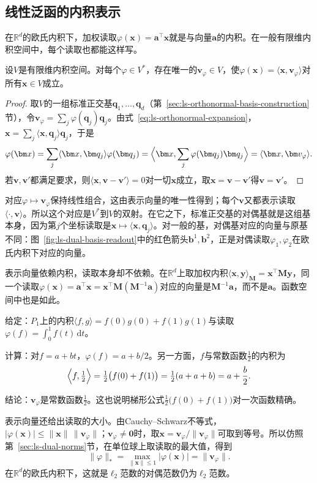 \subsection{线性泛函的内积表示}
\label{sec:ls-riesz-representation}
在$\mathbb R^d$的欧氏内积下，加权读取$\varphi(\bm x)=\bm a^\top\bm x$就是与向量$\bm a$的内积。在一般有限维内积空间中，每个读取也都能这样写。
\begin{theorem}[有限维Riesz表示定理]
\label{thm:ls-riesz-representation}
设$V$是有限维内积空间。对每个$\varphi\in V^*$，存在唯一的$\bm v_\varphi\in V$，使$\varphi(\bm x)=\langle\bm x,\bm v_\varphi\rangle$对所有$\bm x\in V$成立。
\end{theorem}
\begin{proof}
取$V$的一组标准正交基$\bm q_1,\ldots,\bm q_d$（第~\ref{sec:ls-orthonormal-basis-construction}节），令$\bm v_\varphi=\sum_j\varphi(\bm q_j)\bm q_j$。由式~\eqref{eq:ls-orthonormal-expansion}，$\bm x=\sum_j\langle\bm x,\bm q_j\rangle\bm q_j$，于是
\[
 \varphi(\bm x)=\sum_j\langle\bm x,\bm q_j\rangle\varphi(\bm q_j)=\Bigl\langle\bm x,\sum_j\varphi(\bm q_j)\bm q_j\Bigr\rangle=\langle\bm x,\bm v_\varphi\rangle.
\]
若$\bm v,\bm v'$都满足要求，则$\langle\bm x,\bm v-\bm v'\rangle=0$对一切$\bm x$成立，取$\bm x=\bm v-\bm v'$得$\bm v=\bm v'$。
\end{proof}
对应$\varphi\mapsto\bm v_\varphi$保持线性组合，这由表示向量的唯一性得到；每个$\bm v$又都表示读取$\langle\cdot,\bm v\rangle$。所以这个对应是$V^*$到$V$的双射。在它之下，标准正交基的对偶基就是这组基本身，因为第$j$个坐标读取是$\bm x\mapsto\langle\bm x,\bm q_j\rangle$。对一般的基，对偶基对应的向量与原基不同：图~\ref{fig:ls-dual-basis-readout}中的红色箭头$\bm b^1,\bm b^2$，正是对偶读取$\varphi_1,\varphi_2$在欧氏内积下对应的向量。

表示向量依赖内积，读取本身却不依赖。在$\mathbb R^d$上取加权内积$\langle\bm x,\bm y\rangle_{\bm M}=\bm x^\top\bm M\bm y$，同一个读取$\varphi(\bm x)=\bm a^\top\bm x=\bm x^\top\bm M(\bm M^{-1}\bm a)$对应的向量是$\bm M^{-1}\bm a$，而不是$\bm a$。函数空间中也是如此。
\begin{example}[积分读取在两点内积下的表示向量]
\label{ex:ls-riesz-integral-two-point}
给定：$P_1$上的内积$\langle f,g\rangle=f(0)g(0)+f(1)g(1)$与读取$\varphi(f)=\int_0^1f(t)\,\mathrm dt$。

计算：对$f=a+bt$，$\varphi(f)=a+b/2$。另一方面，$f$与常数函数$\tfrac12$的内积为
\[
 \Bigl\langle f,\tfrac12\Bigr\rangle=\tfrac12\bigl(f(0)+f(1)\bigr)=\tfrac12(a+a+b)=a+\frac b2 .
\]

结论：$\bm v_\varphi$是常数函数$\tfrac12$。这也说明梯形公式$\tfrac12\bigl(f(0)+f(1)\bigr)$对一次函数精确。
\end{example}
表示向量还给出读取的大小。由Cauchy--Schwarz不等式，$|\varphi(\bm x)|\leq\lVert\bm x\rVert\,\lVert\bm v_\varphi\rVert$；$\bm v_\varphi\neq\bm0$时，取$\bm x=\bm v_\varphi/\lVert\bm v_\varphi\rVert$可取到等号。所以仿照第~\ref{sec:ls-dual-norms}节，在单位球上取读取的最大值，得到
\[
 \lVert\varphi\rVert_*=\max_{\lVert\bm x\rVert\leq1}|\varphi(\bm x)|=\lVert\bm v_\varphi\rVert .
\]
在$\mathbb R^d$的欧氏内积下，这就是$\ell_2$范数的对偶范数仍为$\ell_2$范数。


